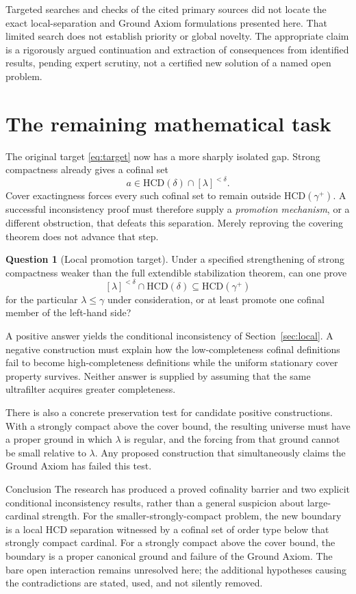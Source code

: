 \documentclass[11pt,letterpaper]{article}
\theoremstyle{definition}
\newcommand{\HCD}{\mathrm{HCD}}
\newtheorem{question}[definition]{Question}
\numberwithin{equation}{section}
\begin{document}
Targeted searches and checks of the cited primary sources did not locate the exact local-separation and Ground Axiom formulations presented here. That limited search does not establish priority or global novelty. The appropriate claim is a rigorously argued continuation and extraction of consequences from identified results, pending expert scrutiny, not a certified new solution of a named open problem.

\section{The remaining mathematical task}\label{sec:remaining}

The original target \eqref{eq:target} now has a more sharply isolated gap. Strong compactness already gives a cofinal set
\[
 a\in\HCD(\delta)\cap[\lambda]^{<\delta}.
\]
Cover exactingness forces every such cofinal set to remain outside $\HCD(\gamma^+)$. A successful inconsistency proof must therefore supply a \emph{promotion mechanism}, or a different obstruction, that defeats this separation. Merely reproving the covering theorem does not advance that step.

\begin{question}[Local promotion target]
Under a specified strengthening of strong compactness weaker than the full extendible stabilization theorem, can one prove
\[
 [\lambda]^{<\delta}\cap\HCD(\delta)
       \subseteq\HCD(\gamma^+)
\]
for the particular $\lambda\leq\gamma$ under consideration, or at least promote one cofinal member of the left-hand side?
\end{question}

A positive answer yields the conditional inconsistency of Section~\ref{sec:local}. A negative construction must explain how the low-completeness cofinal definitions fail to become high-completeness definitions while the uniform stationary cover property survives. Neither answer is supplied by assuming that the same ultrafilter acquires greater completeness.

There is also a concrete preservation test for candidate positive constructions. With a strongly compact above the cover bound, the resulting universe must have a proper ground in which $\lambda$ is regular, and the forcing from that ground cannot be small relative to $\lambda$. Any proposed construction that simultaneously claims the Ground Axiom has failed this test.

\begin{assessment}{Conclusion}
The research has produced a proved cofinality barrier and two explicit conditional inconsistency results, rather than a general suspicion about large-cardinal strength. For the smaller-strongly-compact problem, the new boundary is a local HCD separation witnessed by a cofinal set of order type below that strongly compact cardinal. For a strongly compact above the cover bound, the boundary is a proper canonical ground and failure of the Ground Axiom. The bare open interaction remains unresolved here; the additional hypotheses causing the contradictions are stated, used, and not silently removed.
\end{assessment}
\end{document}

